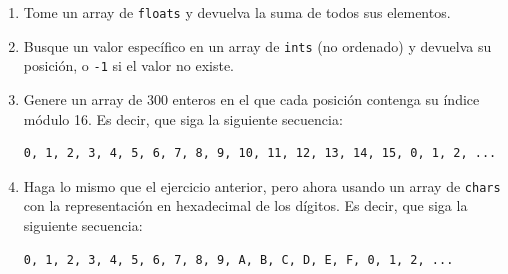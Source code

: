 \documentclass[a4paper]{article}
\newcommand{\code}[1]{\texttt{#1}}
\begin{document}
\begin{enumerate}
    \item Tome un array de \code{floats} y devuelva la suma de todos sus elementos.
    \item Busque un valor específico en un array de \code{ints} (no ordenado) y devuelva su posición, o \code{-1} si el valor no existe.
    \item Genere un array de 300 enteros en el que cada posición contenga su índice módulo 16. Es decir, que siga la siguiente secuencia:

\begin{verbatim}
0, 1, 2, 3, 4, 5, 6, 7, 8, 9, 10, 11, 12, 13, 14, 15, 0, 1, 2, ...
\end{verbatim}

    \item Haga lo mismo que el ejercicio anterior, pero ahora usando un array de \code{chars} con la representación en hexadecimal de los dígitos. Es decir, que siga la siguiente secuencia:

\begin{verbatim}
0, 1, 2, 3, 4, 5, 6, 7, 8, 9, A, B, C, D, E, F, 0, 1, 2, ...
\end{verbatim}
    

\end{enumerate}
\end{document}
